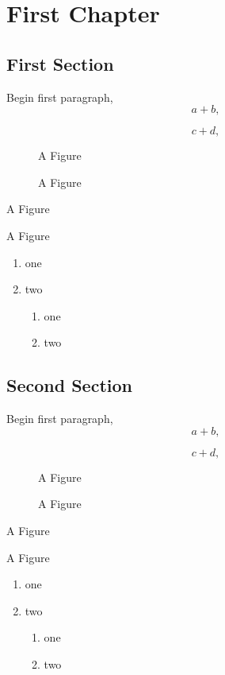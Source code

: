 \documentclass{book}
\begin{document}
\chapter{First Chapter}
\section{First Section}
Begin first paragraph,
\begin{equation}
 a + b,
\end{equation}

\begin{equation}
 c + d,
\end{equation}

\begin{figure}
A Figure
\caption{A Figure}
\end{figure}

\begin{table}
A Figure
\caption{A Figure}
\end{table}

\begin{enumerate}
 \item one
 \item two
   \begin{enumerate}
    \item one
    \item two
   \end{enumerate}
\end{enumerate}


\section{Second Section}
Begin first paragraph,
\begin{equation}
 a + b,
\end{equation}

\begin{equation}
 c + d,
\end{equation}

\begin{figure}
A Figure
\caption{A Figure}
\end{figure}

\begin{table}
A Figure
\caption{A Figure}
\end{table}

\begin{enumerate}
 \item one
 \item two
   \begin{enumerate}
    \item one
    \item two
   \end{enumerate}
\end{enumerate}
\end{document}
